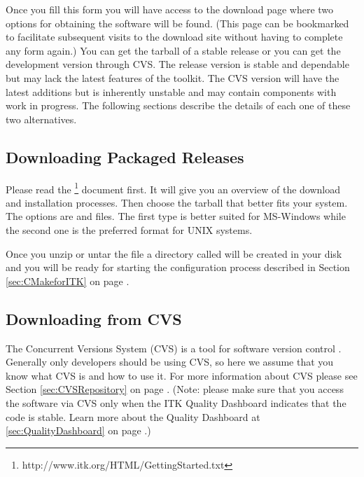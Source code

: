Once you fill this form you will have access to the download page where two
options for obtaining the software will be found. (This page can be
bookmarked to facilitate subsequent visits to the download site without
having to complete any form again.) You can get the tarball of a stable
release or you can get the development version through CVS.  The release
version is stable and dependable but may lack the latest features of the
toolkit. The CVS version will have the latest additions but is inherently
unstable and may contain components with work in progress.  The following
sections describe the details of each one of these two alternatives.

\subsection{Downloading Packaged Releases}
\label{sec:DownloadingReleases}


Please read the
\footnote{http://www.itk.org/HTML/GettingStarted.txt}
document first. It will give you an overview of the download and installation
processes. Then choose the tarball that better fits your system. The options
are  and  files.  The first type is better suited for
MS-Windows while the second one is the preferred format for UNIX systems.

Once you unzip or untar the file a directory called  will be
created in your disk and you will be ready for starting the configuration
process described in Section \ref{sec:CMakeforITK} on page 
\pageref{sec:CMakeforITK}.

\subsection{Downloading from CVS}
\label{sec:DownloadingFromCVS}


The Concurrent Versions System (CVS) is a tool for software version control
\cite{Fogel1999}. Generally only developers should be using CVS, so here we 
assume that you know what CVS is and how to use it.  For more information
about CVS please see Section \ref{sec:CVSRepository} on page 
\pageref{sec:CVSRepository}. (Note: please make sure that you access the 
software via CVS only when the ITK Quality Dashboard indicates that the 
code is stable. Learn more about the Quality Dashboard at
\ref{sec:QualityDashboard} on page \pageref{sec:QualityDashboard}.)

